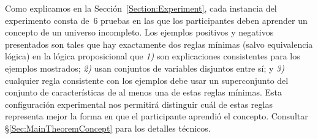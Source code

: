 Como explicamos en la Sección~\ref{Section:Experiment}, cada instancia del experimento consta de~6 pruebas en las que los participantes deben aprender un concepto de un universo incompleto. Los ejemplos positivos y negativos presentados son tales que hay exactamente dos reglas mínimas (salvo equivalencia lógica) en la lógica proposicional que {\em 1)} son explicaciones consistentes para los ejemplos mostrados; {\em 2)} usan conjuntos de variables disjuntos entre sí; y {\em 3)} cualquier regla consistente con los ejemplos debe usar un superconjunto del conjunto de características de al menos una de estas reglas mínimas. Esta configuración experimental nos permitirá distinguir cuál de estas reglas representa mejor la forma en que el participante aprendió el concepto. Consultar \S\ref{Sec:MainTheoremConcept} para los detalles técnicos.


